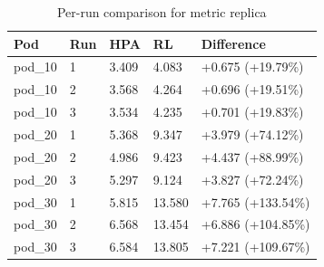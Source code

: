 \begin{table}[ht]
  \centering
  \caption{Per-run comparison for metric replica}\label{tab:deskriptif-replica-per-run}
  \begin{tabular}{lllll}
    \toprule
    Pod & Run & HPA & RL & Difference \\
    \midrule
    pod\_10 & 1 & 3.409 & 4.083 & +0.675 (+19.79\%) \\
    pod\_10 & 2 & 3.568 & 4.264 & +0.696 (+19.51\%) \\
    pod\_10 & 3 & 3.534 & 4.235 & +0.701 (+19.83\%) \\
    pod\_20 & 1 & 5.368 & 9.347 & +3.979 (+74.12\%) \\
    pod\_20 & 2 & 4.986 & 9.423 & +4.437 (+88.99\%) \\
    pod\_20 & 3 & 5.297 & 9.124 & +3.827 (+72.24\%) \\
    pod\_30 & 1 & 5.815 & 13.580 & +7.765 (+133.54\%) \\
    pod\_30 & 2 & 6.568 & 13.454 & +6.886 (+104.85\%) \\
    pod\_30 & 3 & 6.584 & 13.805 & +7.221 (+109.67\%) \\
    \bottomrule
  \end{tabular}
\end{table}